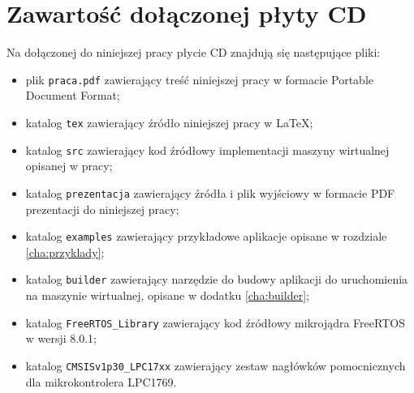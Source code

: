 \chapter{Zawartość dołączonej płyty CD}
\label{cha:cd}

Na dołączonej do niniejszej pracy płycie CD znajdują się następujące pliki:

\begin{itemize}

\item plik \texttt{praca.pdf} zawierający treść niniejszej pracy w formacie Portable Document Format;
\item katalog \texttt{tex} zawierający źródło niniejszej pracy w  \LaTeX;
\item katalog \texttt{src} zawierający kod źródłowy implementacji maszyny wirtualnej opisanej w pracy;
\item katalog \texttt{prezentacja} zawierający źródła i plik wyjściowy w formacie PDF prezentacji do niniejszej pracy;
\item katalog \texttt{examples} zawierający przykładowe aplikacje opisane w rozdziale \ref{cha:przyklady};
\item katalog \texttt{builder} zawierający narzędzie do budowy aplikacji do uruchomienia na maszynie wirtualnej, opisane w dodatku \ref{cha:builder};
\item katalog \texttt{FreeRTOS\_Library} zawierający kod źródłowy mikrojądra FreeRTOS w wersji 8.0.1;
\item katalog \texttt{CMSISv1p30\_LPC17xx} zawierający zestaw nagłówków pomocnicznych dla mikrokontrolera LPC1769.

\end{itemize}